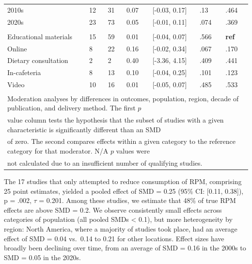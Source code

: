 \documentclass[preprint, 3p,
authoryear]{elsarticle} %
\begin{document}
\begin{table}[!ht]
\begin{tabular}[t]{lllll>{\raggedright\arraybackslash}p{2 cm}>{\raggedright\arraybackslash}p{2 cm}}
\hspace{1em}2010s & 12 & 31 & 0.07 & {}[-0.03, 0.17] & .13 & .464\\
\hspace{1em}2020s & 23 & 73 & 0.05 & {}[-0.01, 0.11] & .074 & .369\\
\addlinespace[0.3em]
\multicolumn{7}{l}{\textbf{Method of Delivery}}\\
\hspace{1em}Educational materials & 15 & 59 & 0.01 & {}[-0.04, 0.07] & .566 & \textbf{ref}\\
\hspace{1em}Online & 8 & 22 & 0.16 & {}[-0.02, 0.34] & .067 & .170\\
\hspace{1em}Dietary consultation & 2 & 2 & 0.40 & {}[-3.36, 4.15] & .409 & .441\\
\hspace{1em}In-cafeteria & 8 & 13 & 0.10 & {}[-0.04, 0.25] & .101 & .123\\
\hspace{1em}Video & 10 & 16 & 0.01 & {}[-0.05, 0.07] & .485 & .533\\
\bottomrule
\multicolumn{7}{l}{\textsuperscript{} Moderation analyses by differences in outcomes, population, region, decade of publication, and delivery method. The first $p$}\\
\multicolumn{7}{l}{value column tests the hypothesis that the subset of studies with a given characteristic is significantly different than an SMD}\\
\multicolumn{7}{l}{of zero. The second compares effects within a given category to the reference category for that moderator. N/A $p$ values were}\\
\multicolumn{7}{l}{not calculated due to an insufficient number of qualifying studies.}\\
\end{tabular}
\end{table}

The 17 studies that only attempted to reduce consumption of RPM,
comprising 25 point estimates, yielded a pooled effect of SMD = 0.25
(95\% CI: {[}0.11, 0.38{]}), p = .002, \(\tau\) = 0.201. Among these
studies, we estimate that 48\% of true RPM effects are above SMD = 0.2.
We observe consistently small effects across categories of population
(all pooled SMDs \textless{} 0.1), but more heterogeneity by region:
North America, where a majority of studies took place, had an average
effect of SMD = 0.04 vs.~0.14 to 0.21 for other locations. Effect sizes
have broadly been declining over time, from an average of SMD = 0.16 in
the 2000s to SMD = 0.05 in the 2020s.
\end{document}
